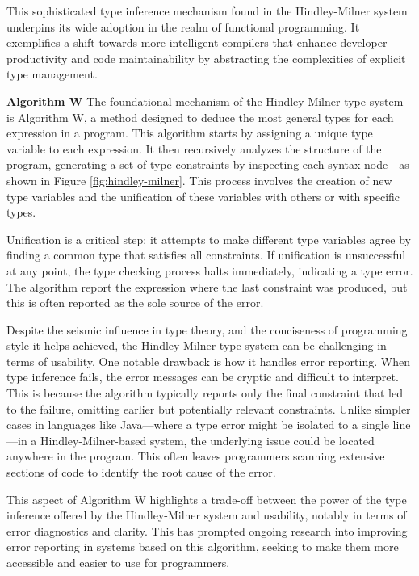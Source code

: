 This sophisticated type inference mechanism found in the Hindley-Milner system underpins its wide adoption in the realm of functional programming. It exemplifies a shift towards more intelligent compilers that enhance developer productivity and code maintainability by abstracting the complexities of explicit type management.

\textbf{Algorithm W}  The foundational mechanism of the Hindley-Milner type system is Algorithm W, a method designed to deduce the most general types for each expression in a program. This algorithm starts by assigning a unique type variable to each expression. It then recursively analyzes the structure of the program, generating a set of type constraints by inspecting each syntax node—as shown in Figure \ref{fig:hindley-milner}. This process involves the creation of new type variables and the unification of these variables with others or with specific types.

Unification is a critical step: it attempts to make different type variables agree by finding a common type that satisfies all constraints. If unification is unsuccessful at any point, the type checking process halts immediately, indicating a type error. The algorithm report the expression where the last constraint was produced, but this is often reported as the sole source of the error.


Despite the seismic influence in type theory, and the conciseness of programming style it helps achieved,  the Hindley-Milner type system can be challenging in terms of usability. One notable drawback is how it handles error reporting. When type inference fails, the error messages can be cryptic and difficult to interpret. This is because the algorithm typically reports only the final constraint that led to the failure, omitting earlier but potentially relevant constraints. Unlike simpler cases in languages like Java—where a type error might be isolated to a single line—in a Hindley-Milner-based system, the underlying issue could be located anywhere in the program. This often leaves programmers scanning extensive sections of code to identify the root cause of the error. 

This aspect of Algorithm W highlights a trade-off between the power of the type inference offered by the Hindley-Milner system and usability, notably in terms of error diagnostics and clarity. This has prompted ongoing research into improving error reporting in systems based on this algorithm, seeking to make them more accessible and easier to use for programmers.

